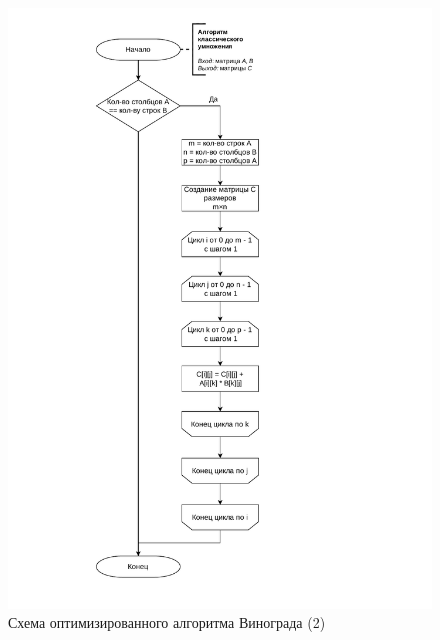 \begin{figure}[h]
	\centering
	\includegraphics[height=0.9\textheight, page=5]{algo-scheme.pdf}
	\caption{Схема оптимизированного алгоритма Винограда (2)}
	\label{fig:vinograd_opt2}
\end{figure}

